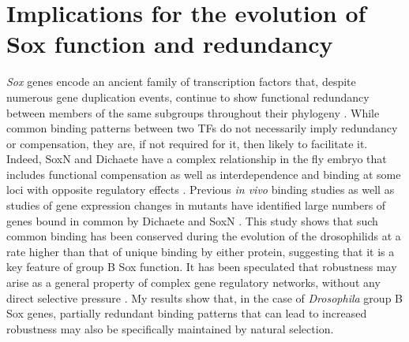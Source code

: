 \section{Implications for the evolution of Sox function and redundancy}
\emph{Sox} genes encode an ancient family of transcription factors that, despite numerous gene duplication events, continue to show functional redundancy between members of the same subgroups throughout their phylogeny \citep{bhattaram_organogenesis_2010,ferri_sox2_2004,guth_having_2008,matsui_redundant_2006,nishiguchi_sox1_1998,okuda_b1_2010,overton_evidence_2002,rizzoti_sox3_2004,uchikawa_b1_2011,uwanogho_embryonic_1995,wegner_stem_2005,wood_comparative_1999}. While common binding patterns between two TFs do not necessarily imply redundancy or compensation, they are, if not required for it, then likely to facilitate it. Indeed, SoxN and Dichaete have a complex relationship in the fly embryo that includes functional compensation as well as interdependence and binding at some loci with opposite regulatory effects \citep{ferrero_soxneuro_2014,overton_evidence_2002}. Previous \emph{in vivo} binding studies as well as studies of gene expression changes in mutants have identified large numbers of genes bound in common by Dichaete and SoxN \citep{aleksic_role_2013,ferrero_soxneuro_2014}. This study shows that such common binding has been conserved during the evolution of the drosophilids at a rate higher than that of unique binding by either protein, suggesting that it is a key feature of group B Sox function. It has been speculated that robustness may arise as a general property of complex gene regulatory networks, without any direct selective pressure \citep{aldana_robustness_2007}. My results show that, in the case of \emph{Drosophila} group B Sox genes, partially redundant binding patterns that can lead to increased robustness may also be specifically maintained by natural selection.\\


